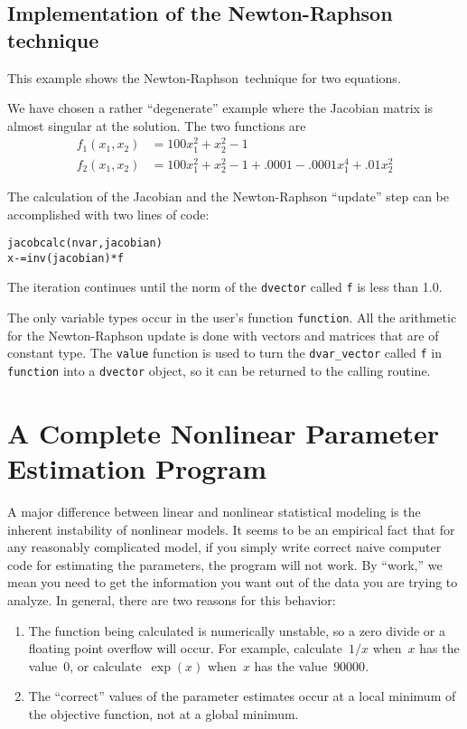 \documentclass{admbmanual}
\newcommand\nr{{Newton-Raphson}}
\begin{document}
\section{Implementation of the Newton-Raphson technique}

This example shows the \nr\ technique for two equations.


We have chosen a rather ``degenerate'' example where the Jacobian matrix is
almost singular at the solution. The two functions are
\begin{align*}
  f_1(x_1,x_2)&=100x_1^2+x_2^2-1 \\[6pt]
  f_2(x_1,x_2)&=100x_1^2+x_2^2-1+.0001-.0001x_1^4+.01x_2^2
\end{align*}

The calculation of the Jacobian and the Newton-Raphson ``update'' step can be
accomplished with two lines of code:
\begin{lstlisting}
jacobcalc(nvar,jacobian)
x-=inv(jacobian)*f
\end{lstlisting}
The iteration continues until the norm of the \texttt{dvector} called \texttt{f}
is less than 1.0.

The only variable types occur in the user's function \texttt{function}. All the
arithmetic for the Newton-Raphson update is done with vectors and matrices that
are of constant type. The \texttt{value} function is used to turn the
\texttt{dvar\_vector} called \texttt{f} in \texttt{function} into a
\texttt{dvector} object, so it can be returned to the calling routine.


\chapter{A Complete Nonlinear Parameter Estimation Program}
\label{nonlinear-estimation}

A major difference between linear and nonlinear statistical modeling is the
inherent instability of nonlinear models. It seems to be an empirical fact that
for any reasonably complicated model, if you simply write correct naive computer
code for estimating the parameters, the program will not work. By ``work,'' we
mean you need to get the information you want out of the data you are trying to
analyze. In general, there are two reasons for this behavior:
\begin{enumerate}
  \item The function being calculated is numerically unstable, so a zero divide
  or a floating point overflow will occur. For example, calculate~$1/x$ when~$x$
  has the value~$0$, or calculate~$\exp(x)$ when~$x$ has the value~$90000$.

  \item The ``correct'' values of the parameter estimates occur at a local
  minimum of the objective function, not at a global minimum.
\end{enumerate}
\end{document}

